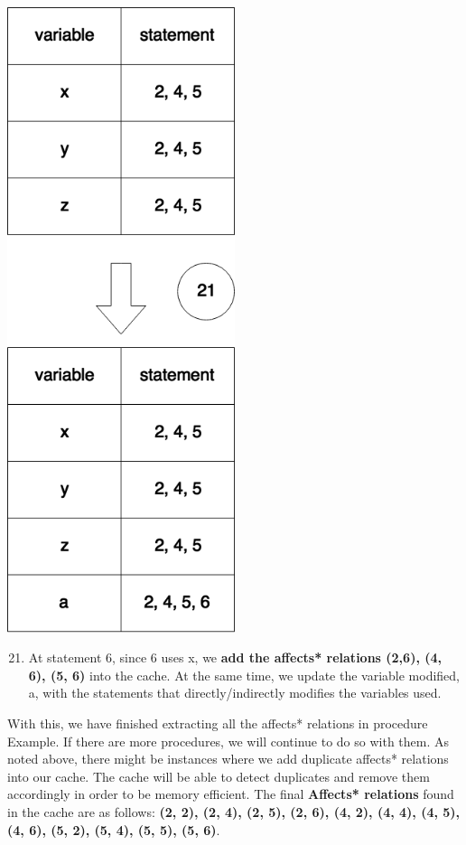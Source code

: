 \documentclass[12pt]{article}
\begin{document}
{{{{{{{{{{{{{{\begin{center}
\noindent
\begin{minipage}{18em}
\begin{flushleft}
\noindent
\includegraphics[width=0.5\textwidth]{affects5.png}
\end{flushleft}
\end{minipage}
\begin{minipage}{20em}
\normalsize
\begin{enumerate}
 \setcounter{enumi}{20}
\item At statement 6, since 6 uses x, we \textbf{add the affects* relations (2,6), (4, 6), (5, 6)} into the cache. At the same time, we update the variable modified, a, with the statements that directly/indirectly modifies the variables used.
\end{enumerate}
With this, we have finished extracting all the affects* relations in procedure Example. If there are more procedures, we will continue to do so with them. As noted above, there might be instances where we add duplicate affects* relations into our cache. The cache will be able to detect duplicates and remove them accordingly in order to be memory efficient.
\newline \newline
The final \textbf{Affects* relations} found in the cache are as follows: \newline
\textbf{(2, 2), (2, 4), (2, 5), (2, 6), (4, 2), (4, 4), (4, 5), (4, 6), (5, 2), (5, 4), (5, 5), (5, 6)}.


\end{minipage}
\end{center}}}}}}}}}}}}}}}
\end{document}

